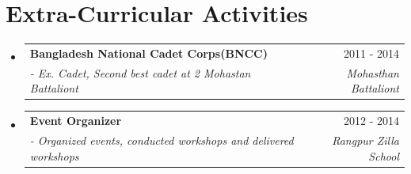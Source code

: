 \documentclass[a4paper]{article}
\makeatletter
\newcommand{\resumeSubheading}[4]{
  \vspace{-1pt}\item
    \begin{tabular*}{0.97\textwidth}{l@{\extracolsep{\fill}}r}
      \textbf{#1} & #2 \\
      \textit{#3} & \textit{#4} \\
    \end{tabular*}\vspace{-5pt}
}
\newcommand{\resumeSubHeadingListStart}{\begin{itemize}[leftmargin=*]}
\newcommand{\resumeSubHeadingListEnd}{\end{itemize}}
\makeatother
\begin{document}

\section{Extra-Curricular Activities}
  \resumeSubHeadingListStart
	\resumeSubheading
    {Bangladesh National Cadet Corps(BNCC)}{2011 - 2014}
    {- \quad Ex. Cadet, Second best cadet at 2 Mohastan Battaliont}{Mohasthan Battaliont}
    \vspace{.5pt}
    \resumeSubheading
    {Event Organizer}{2012 - 2014}
    {- \quad Organized events, conducted workshops and delivered workshops}{Rangpur Zilla School}
\resumeSubHeadingListEnd
\vspace{1pt}





\end{document}

